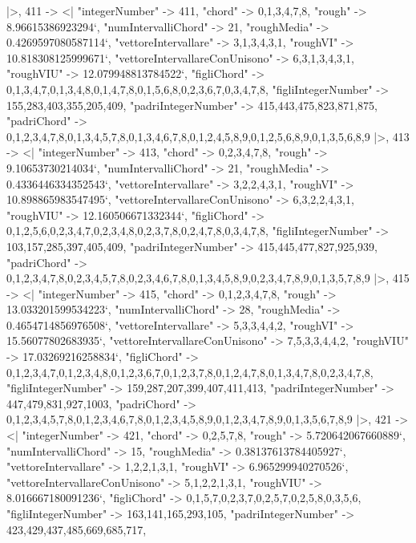 \documentclass[
]{article}
\begin{document}
\begin{DatasetVerbatim}
  |>,
  411 -> <|
    "integerNumber" -> 411,
    "chord" -> {0,1,3,4,7,8},
    "rough" -> 8.96615386923294`,
    "numIntervalliChord" -> 21,
    "roughMedia" -> 0.4269597080587114`,
    "vettoreIntervallare" -> {3,1,3,4,3,1},
    "roughVI" -> 10.818308125999671`,
    "vettoreIntervallareConUnisono" -> {6,3,1,3,4,3,1},
    "roughVIU" -> 12.079948813784522`,
    "figliChord" -> {{0,1,3,4,7},{0,1,3,4,8},{0,1,4,7,8},{0,1,5,6,8},{0,2,3,6,7},{0,3,4,7,8}},
    "figliIntegerNumber" -> {155,283,403,355,205,409},
    "padriIntegerNumber" -> {415,443,475,823,871,875},
    "padriChord" -> {{0,1,2,3,4,7,8},{0,1,3,4,5,7,8},{0,1,3,4,6,7,8},{0,1,2,4,5,8,9},{0,1,2,5,6,8,9},{0,1,3,5,6,8,9}}
  |>,
  413 -> <|
    "integerNumber" -> 413,
    "chord" -> {0,2,3,4,7,8},
    "rough" -> 9.10653730214034`,
    "numIntervalliChord" -> 21,
    "roughMedia" -> 0.4336446334352543`,
    "vettoreIntervallare" -> {3,2,2,4,3,1},
    "roughVI" -> 10.898865983547495`,
    "vettoreIntervallareConUnisono" -> {6,3,2,2,4,3,1},
    "roughVIU" -> 12.160506671332344`,
    "figliChord" -> {{0,1,2,5,6},{0,2,3,4,7},{0,2,3,4,8},{0,2,3,7,8},{0,2,4,7,8},{0,3,4,7,8}},
    "figliIntegerNumber" -> {103,157,285,397,405,409},
    "padriIntegerNumber" -> {415,445,477,827,925,939},
    "padriChord" -> {{0,1,2,3,4,7,8},{0,2,3,4,5,7,8},{0,2,3,4,6,7,8},{0,1,3,4,5,8,9},{0,2,3,4,7,8,9},{0,1,3,5,7,8,9}}
  |>,
  415 -> <|
    "integerNumber" -> 415,
    "chord" -> {0,1,2,3,4,7,8},
    "rough" -> 13.033201599534223`,
    "numIntervalliChord" -> 28,
    "roughMedia" -> 0.4654714856976508`,
    "vettoreIntervallare" -> {5,3,3,4,4,2},
    "roughVI" -> 15.56077802683935`,
    "vettoreIntervallareConUnisono" -> {7,5,3,3,4,4,2},
    "roughVIU" -> 17.03269216258834`,
    "figliChord" -> {{0,1,2,3,4,7},{0,1,2,3,4,8},{0,1,2,3,6,7},{0,1,2,3,7,8},{0,1,2,4,7,8},{0,1,3,4,7,8},{0,2,3,4,7,8}},
    "figliIntegerNumber" -> {159,287,207,399,407,411,413},
    "padriIntegerNumber" -> {447,479,831,927,1003},
    "padriChord" -> {{0,1,2,3,4,5,7,8},{0,1,2,3,4,6,7,8},{0,1,2,3,4,5,8,9},{0,1,2,3,4,7,8,9},{0,1,3,5,6,7,8,9}}
  |>,
  421 -> <|
    "integerNumber" -> 421,
    "chord" -> {0,2,5,7,8},
    "rough" -> 5.720642067660889`,
    "numIntervalliChord" -> 15,
    "roughMedia" -> 0.38137613784405927`,
    "vettoreIntervallare" -> {1,2,2,1,3,1},
    "roughVI" -> 6.965299940270526`,
    "vettoreIntervallareConUnisono" -> {5,1,2,2,1,3,1},
    "roughVIU" -> 8.016667180091236`,
    "figliChord" -> {{0,1,5,7},{0,2,3,7},{0,2,5,7},{0,2,5,8},{0,3,5,6}},
    "figliIntegerNumber" -> {163,141,165,293,105},
    "padriIntegerNumber" -> {423,429,437,485,669,685,717},

\end{DatasetVerbatim}
\end{document}
